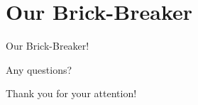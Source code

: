 \documentclass{beamer}
\begin{document}
\section{Our Brick-Breaker}
\begin{frame}
\Huge{\centerline{Our Brick-Breaker!}}
\end{frame}

\begin{frame}
\Huge{\centerline{Any questions?}}
\end{frame}

\begin{frame}
\Huge{\centerline{Thank you for your attention!}}
\end{frame}

\end{document}
